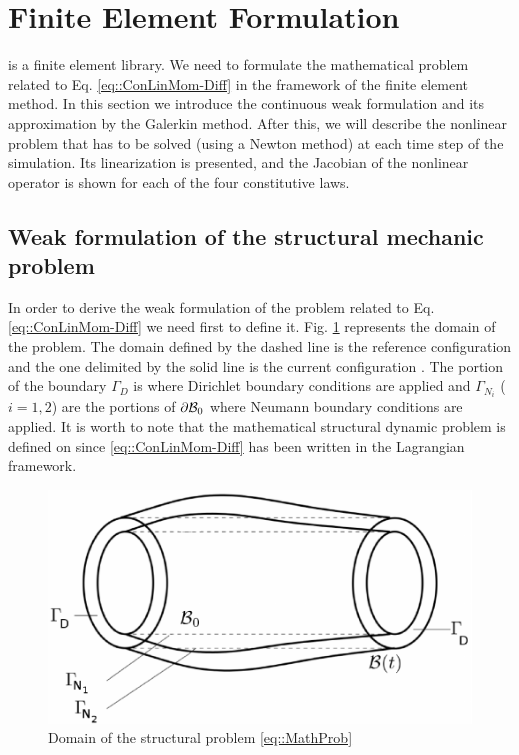 \section{Finite Element Formulation}
\label{sct-FEF} \LV is a finite element library. We need to formulate
the mathematical problem related to Eq. \eqref{eq::ConLinMom-Diff} in
the framework of the finite element method. In this section we
introduce the continuous weak formulation and its approximation by the
Galerkin method. After this, we will describe the nonlinear problem
that has to be solved (using a Newton method) at each time step of the
simulation. Its linearization is presented, and the Jacobian of the
nonlinear operator is shown for each of the four constitutive laws.

\subsection{Weak formulation of the structural mechanic problem}
\label{sct-ContinuousWF} In order to derive the weak formulation of
the problem related to Eq. \eqref{eq::ConLinMom-Diff} we need first to
define it. Fig. \ref{fig::Domain} represents the domain of the
problem. The domain defined by the dashed line is the reference
configuration \RefCon and the one delimited by the solid line is the
current configuration \CurCon. The portion of the boundary $\Gamma _D$
is where Dirichlet boundary conditions are applied and $\Gamma_{N_i}$
($i=1,2$) are the portions of $\partial \mathcal{B}_0$ where Neumann
boundary conditions are applied. It is worth to note that the
mathematical structural dynamic problem is defined on \RefCon since
\eqref{eq::ConLinMom-Diff} has been written in the Lagrangian
framework.

\begin{figure}[h!]  \centering
  \includegraphics{images/Structure.pdf}
  \caption{Domain of the structural problem \eqref{eq::MathProb}}
  \label{fig::Domain}
\end{figure}

